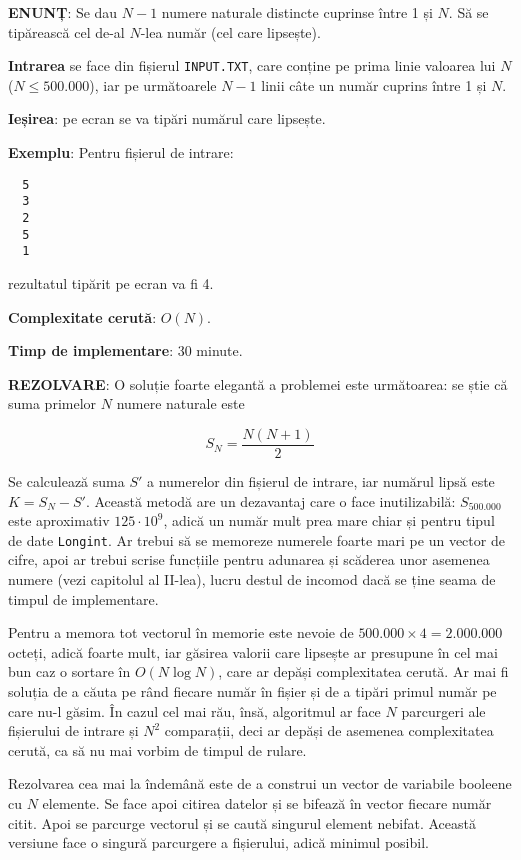 {\bf ENUNȚ}: Se dau $N - 1$ numere naturale distincte cuprinse între 1 și
$N$. Să se tipărească cel de-al $N$-lea număr (cel care lipsește).

{\bf Intrarea} se face din fișierul {\tt INPUT.TXT}, care conține pe prima
linie valoarea lui $N$ ($N \leq 500.000$), iar pe următoarele $N - 1$ linii
câte un număr cuprins între 1 și $N$.

{\bf Ieșirea}: pe ecran se va tipări numărul care lipsește.

{\bf Exemplu}: Pentru fișierul de intrare:

\begin{verbatim}
  5
  3
  2
  5
  1
\end{verbatim}

rezultatul tipărit pe ecran va fi 4.

{\bf Complexitate cerută}: $O(N)$.

{\bf Timp de implementare}: 30 minute.

{\bf REZOLVARE}: O soluție foarte elegantă a problemei este următoarea: se
știe că suma primelor $N$ numere naturale este

\begin{equation}
  S_N = \frac{N(N + 1)}{2}
\end{equation}

Se calculează suma $S'$ a numerelor din fișierul de intrare, iar numărul lipsă
este $K = S_N - S'$. Această metodă are un dezavantaj care o face
inutilizabilă: $S_{500.000}$ este aproximativ $125 \cdot 10^9$, adică un număr
mult prea mare chiar și pentru tipul de date {\tt Longint}. Ar trebui să se
memoreze numerele foarte mari pe un vector de cifre, apoi ar trebui scrise
funcțiile pentru adunarea și scăderea unor asemenea numere (vezi capitolul al
II-lea), lucru destul de incomod dacă se ține seama de timpul de implementare.

Pentru a memora tot vectorul în memorie este nevoie de $500.000 \times 4 =
2.000.000$ octeți, adică foarte mult, iar găsirea valorii care lipsește ar
presupune în cel mai bun caz o sortare în $O(N \log N)$, care ar depăși
complexitatea cerută. Ar mai fi soluția de a căuta pe rând fiecare număr în
fișier și de a tipări primul număr pe care nu-l găsim. În cazul cel mai rău,
însă, algoritmul ar face $N$ parcurgeri ale fișierului de intrare și $N^2$
comparații, deci ar depăși de asemenea complexitatea cerută, ca să nu mai
vorbim de timpul de rulare.

Rezolvarea cea mai la îndemână este de a construi un vector de variabile
booleene cu $N$ elemente. Se face apoi citirea datelor și se bifează în vector
fiecare număr citit. Apoi se parcurge vectorul și se caută singurul element
nebifat. Această versiune face o singură parcurgere a fișierului, adică
minimul posibil.

